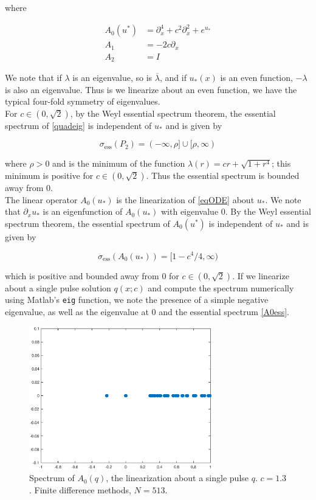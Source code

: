 \documentclass[12pt]{article}
\begin{document}
where

\begin{align}
A_0(u^*) &= \partial_x^4 + c^2 \partial_x^2 + e^{u_*} \\
A_1 &= -2 c \partial_x \\
A_2 &= I
\end{align}

We note that if $\lambda$ is an eigenvalue, so is $\overline{\lambda}$, and if $u_*(x)$ is an even function, $-\lambda$ is also an eigenvalue. Thus is we linearize about an even function, we have the typical four-fold symmetry of eigenvalues.\\

For $c \in (0, \sqrt{2})$, by the Weyl essential spectrum theorem, the essential spectrum of \eqref{quadeig} is independent of $u_*$ and is given by

\begin{equation}\label{ess}
\sigma_{\text{ess}}(P_2) = (-\infty, \rho] \cup [\rho, \infty)
\end{equation}

where $\rho > 0$ and is the minimum of the function $\lambda(r) = c r + \sqrt{1 + r^4}$; this minimum is positive for $c \in (0, \sqrt{2})$. Thus the essential spectrum is bounded away from 0.\\

The linear operator $A_0(u_*)$ is the linearization of \eqref{eqODE} about $u_*$. We note that $\partial_x u_*$ is an eigenfunction of $A_0(u_*)$ with eigenvalue 0. By the Weyl essential spectrum theorem, the essential spectrum of $A_0(u^*)$ is independent of $u_*$ and is given by

\begin{equation}\label{A0ess}
\sigma_{\text{ess}}(A_0(u_*)) = [1 - c^4/4, \infty)
\end{equation}

which is positive and bounded away from 0 for $c \in (0, \sqrt{2})$. If we linearize about a single pulse solution $q(x; c)$ and compute the spectrum numerically using Matlab's \texttt{eig} function, we note the presence of a simple negative eigenvalue, as well as the eigenvalue at 0 and the essential spectrum \eqref{A0ess}.

\begin{figure}[H]
\centering
\includegraphics[width=8cm]{specA0.eps}
\caption{Spectrum of $A_0(q)$, the linearization about a single pulse $q$. $c = 1.3$. Finite difference methods, $N = 513$.}
\end{figure}
\end{document}
